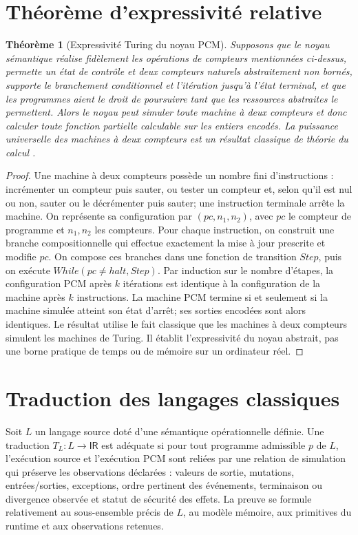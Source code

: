 \documentclass[11pt,a4paper,openany]{book}
\newcommand{\IR}{\mathsf{IR}}
\theoremstyle{definition}
\theoremstyle{plain}
\newtheorem{theorem}[definition]{Théorème}
\theoremstyle{remark}
\begin{document}
\section{Théorème d'expressivité relative}
\begin{theorem}[Expressivité Turing du noyau PCM]
Supposons que le noyau sémantique réalise fidèlement les opérations de compteurs mentionnées ci-dessus, permette un état de contrôle et deux compteurs naturels abstraitement non bornés, supporte le branchement conditionnel et l'itération jusqu'à l'état terminal, et que les programmes aient le droit de poursuivre tant que les ressources abstraites le permettent. Alors le noyau peut simuler toute machine à deux compteurs et donc calculer toute fonction partielle calculable sur les entiers encodés. La puissance universelle des machines à deux compteurs est un résultat classique de théorie du calcul \cite{Minsky1967}.
\end{theorem}
\begin{proof}
Une machine à deux compteurs possède un nombre fini d'instructions : incrémenter un compteur puis sauter, ou tester un compteur et, selon qu'il est nul ou non, sauter ou le décrémenter puis sauter; une instruction terminale arrête la machine. On représente sa configuration par $(pc,n_1,n_2)$, avec $pc$ le compteur de programme et $n_1,n_2$ les compteurs. Pour chaque instruction, on construit une branche compositionnelle qui effectue exactement la mise à jour prescrite et modifie $pc$. On compose ces branches dans une fonction de transition $Step$, puis on exécute $While(pc\neq halt,Step)$. Par induction sur le nombre d'étapes, la configuration PCM après $k$ itérations est identique à la configuration de la machine après $k$ instructions. La machine PCM termine si et seulement si la machine simulée atteint son état d'arrêt; ses sorties encodées sont alors identiques. Le résultat utilise le fait classique que les machines à deux compteurs simulent les machines de Turing. Il établit l'expressivité du noyau abstrait, pas une borne pratique de temps ou de mémoire sur un ordinateur réel.
\end{proof}

\section{Traduction des langages classiques}
Soit $L$ un langage source doté d'une sémantique opérationnelle définie. Une traduction $T_L:L\to\IR$ est adéquate si pour tout programme admissible $p$ de $L$, l'exécution source et l'exécution PCM sont reliées par une relation de simulation qui préserve les observations déclarées : valeurs de sortie, mutations, entrées/sorties, exceptions, ordre pertinent des événements, terminaison ou divergence observée et statut de sécurité des effets. La preuve se formule relativement au sous-ensemble précis de $L$, au modèle mémoire, aux primitives du runtime et aux observations retenues.
\end{document}
